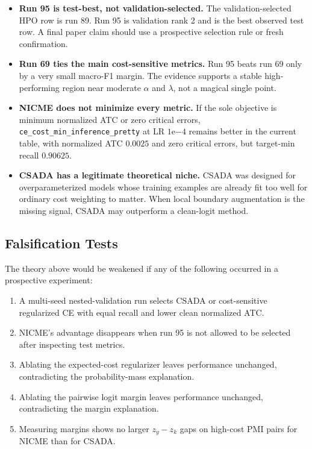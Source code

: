 \documentclass[11pt]{article}
\newcommand{\code}[1]{\texttt{#1}}
\theoremstyle{definition}
\theoremstyle{plain}
\theoremstyle{remark}
\begin{document}
\begin{itemize}
  \item \textbf{Run 95 is test-best, not validation-selected.}
  The validation-selected HPO row is run 89.
  Run 95 is validation rank 2 and is the best observed test row.
  A final paper claim should use a prospective selection rule or fresh confirmation.
  \item \textbf{Run 69 ties the main cost-sensitive metrics.}
  Run 95 beats run 69 only by a very small macro-F1 margin.
  The evidence supports a stable high-performing region near moderate $\alpha$ and $\lambda$, not a magical single point.
  \item \textbf{NICME does not minimize every metric.}
  If the sole objective is minimum normalized ATC or zero critical errors, \code{ce\_cost\_min\_inference\_pretty} at LR $1\mathrm{e}{-4}$ remains better in the current table, with normalized ATC $0.0025$ and zero critical errors, but target-min recall $0.90625$.
  \item \textbf{CSADA has a legitimate theoretical niche.}
  CSADA was designed for overparameterized models whose training examples are already fit too well for ordinary cost weighting to matter.
  When local boundary augmentation is the missing signal, CSADA may outperform a clean-logit method.
\end{itemize}

\subsection{Falsification Tests}

The theory above would be weakened if any of the following occurred in a prospective experiment:

\begin{enumerate}
  \item A multi-seed nested-validation run selects CSADA or cost-sensitive regularized CE with equal recall and lower clean normalized ATC.
  \item NICME's advantage disappears when run 95 is not allowed to be selected after inspecting test metrics.
  \item Ablating the expected-cost regularizer leaves performance unchanged, contradicting the probability-mass explanation.
  \item Ablating the pairwise logit margin leaves performance unchanged, contradicting the margin explanation.
  \item Measuring margins shows no larger $z_y-z_k$ gaps on high-cost PMI pairs for NICME than for CSADA.
\end{enumerate}
\end{document}
